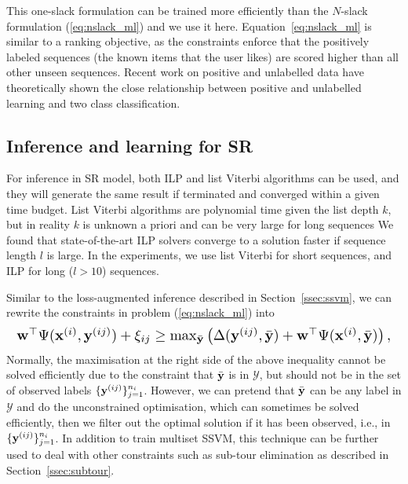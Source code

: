 This one-slack formulation can be trained more efficiently than the $N$-slack formulation (\ref{eq:nslack_ml}) and we use it here.
Equation~\ref{eq:nslack_ml} is similar to a ranking objective, as the constraints enforce
that the positively labeled sequences (the known items that the user likes) are scored
higher than all other unseen sequences. Recent work on positive and unlabelled data have
theoretically shown the close relationship between positive and unlabelled learning and two class
classification.





\secmoveup
\subsection{Inference and learning for SR}
\label{ssec:SRinf}
\textmoveup

For inference in SR model, both ILP and list Viterbi algorithms can be used, and they will generate the
same result if terminated and converged within a given time budget.
List Viterbi algorithms are polynomial time given the list depth $k$,
but in reality $k$ is unknown a priori and can be very large for long sequences
We found that state-of-the-art ILP solvers converge to a solution faster if sequence length $l$ is large.
In the experiments, we use list Viterbi for short sequences, and ILP for long ($l>10$) sequences.

Similar to the loss-augmented inference described in Section~\ref{ssec:ssvm},
we can rewrite the constraints in problem (\ref{eq:nslack_ml}) into
\begin{equation*}
\resizebox{0.99\linewidth}{!}
{$
\w^\top \Psi(\x^{(i)}, \y^{(ij)}) + \xi_{ij} \ge
\max_{\bar{\y}} \left( \Delta(\y^{(ij)}, \bar{\y}) + \w^\top \Psi(\x^{(i)}, \bar{\y}) \right),
$}\eqmoveup
\end{equation*}
Normally, the maximisation at the right side of the above inequality cannot be solved efficiently due to the constraint that
$\bar{\mathbf{y}}$ is in $\mathcal{Y}$,
but should not be in the set of observed labels $\{\mathbf{y}^{(ij)}\}_{j=1}^{n_i}$.
However, we can pretend that $\bar{\mathbf{y}}$ can be any label in $\mathcal{Y}$ and do the unconstrained optimisation,
which can sometimes be solved efficiently, then we filter out the optimal solution if it has been observed,
i.e., in $\{\mathbf{y}^{(ij)}\}_{j=1}^{n_i}$.
In addition to train multiset SSVM, this technique can be further used to deal with other constraints such as sub-tour elimination
as described in Section~\ref{ssec:subtour}.

